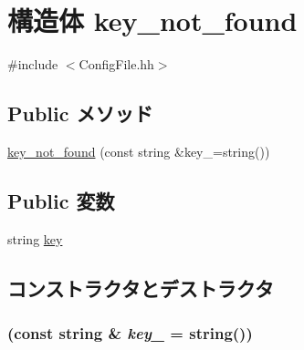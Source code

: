 \hypertarget{structConfigFile_1_1key__not__found}{
\section{構造体 key\_\-not\_\-found}
\label{structConfigFile_1_1key__not__found}
}


{\ttfamily \#include $<$ConfigFile.hh$>$}\subsection*{Public メソッド}
\begin{DoxyCompactItemize}
\item 
\hyperlink{structConfigFile_1_1key__not__found_a32bc647558edd4b686fc242a2754a791}{key\_\-not\_\-found} (const string \&key\_\-=string())
\end{DoxyCompactItemize}
\subsection*{Public 変数}
\begin{DoxyCompactItemize}
\item 
string \hyperlink{structConfigFile_1_1key__not__found_aa8fa75d45876bcbe59f33f49e7d3572d}{key}
\end{DoxyCompactItemize}


\subsection{コンストラクタとデストラクタ}
\hypertarget{structConfigFile_1_1key__not__found_a32bc647558edd4b686fc242a2754a791}{
\subsubsection[{key\_\-not\_\-found}]{ (const string \& {\em key\_\-} = {\ttfamily string()})}}
\label{structConfigFile_1_1key__not__found_a32bc647558edd4b686fc242a2754a791}



\begin{DoxyCode}
114                         : key(key_) {} };
\end{DoxyCode}


